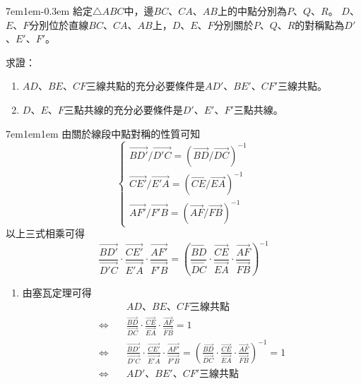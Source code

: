\documentclass[12pt]{article}
\begin{document}
\begin{mybox}[Problem 8]{7em}{1em}{-0.3em}
   給定$\triangle{ABC}$中，邊$BC$、$CA$、$AB$上的中點分別為$P$、$Q$、$R$。
   $D$、$E$、$F$分別位於直線$BC$、$CA$、$AB$上，$D$、$E$、$F$分別關於$P$、$Q$、$R$的對稱點為$D'$、$E'$、$F'$。

   求證：
   \begin{enumerate}[label=(\roman*)]
       \item $AD$、$BE$、$CF$三線共點的充分必要條件是$AD'$、$BE'$、$CF'$三線共點。
       \item $D$、$E$、$F$三點共線的充分必要條件是$D'$、$E'$、$F'$三點共線。
   \end{enumerate}
\end{mybox}
\begin{mybox}[Answer 8]{7em}{1em}{1em}
    由關於線段中點對稱的性質可知
    $$
        \begin{cases}
            \overrightarrow{BD'}/\overrightarrow{D'C}=\left(\overrightarrow{BD}/\overrightarrow{DC}\right)^{-1}\\
            \overrightarrow{CE'}/\overrightarrow{E'A}=\left(\overrightarrow{CE}/\overrightarrow{EA}\right)^{-1}\\
            \overrightarrow{AF'}/\overrightarrow{F'B}=\left(\overrightarrow{AF}/\overrightarrow{FB}\right)^{-1}
        \end{cases}
    $$
    以上三式相乘可得
    $$
        \frac{\overrightarrow{BD'}}{\overrightarrow{D'C}}
        \cdot\frac{\overrightarrow{CE'}}{\overrightarrow{E'A}}
        \cdot\frac{\overrightarrow{AF'}}{\overrightarrow{F'B}} 
        =\left(\frac{\overrightarrow{BD}}{\overrightarrow{DC}}
        \cdot\frac{\overrightarrow{CE}}{\overrightarrow{EA}}
        \cdot\frac{\overrightarrow{AF}}{\overrightarrow{FB}} \right)^{-1}
    $$
    \begin{enumerate}[label=(\roman*)]
        \item 由塞瓦定理可得    
        \begin{align*}
           &\text{$AD$、$BE$、$CF$三線共點}\\
           \Leftrightarrow\quad&\frac{\overrightarrow{BD}}{\overrightarrow{DC}}
           \cdot\frac{\overrightarrow{CE}}{\overrightarrow{EA}}
           \cdot\frac{\overrightarrow{AF}}{\overrightarrow{FB}}=1\\
           \Leftrightarrow\quad&\frac{\overrightarrow{BD'}}{\overrightarrow{D'C}}
           \cdot\frac{\overrightarrow{CE'}}{\overrightarrow{E'A}}
           \cdot\frac{\overrightarrow{AF'}}{\overrightarrow{F'B}}
           =\left(\frac{\overrightarrow{BD}}{\overrightarrow{DC}}
           \cdot\frac{\overrightarrow{CE}}{\overrightarrow{EA}}
           \cdot\frac{\overrightarrow{AF}}{\overrightarrow{FB}}\right)^{-1}=1\\
           \Leftrightarrow\quad&\text{$AD'$、$BE'$、$CF'$三線共點}
        \end{align*}


\end{enumerate}
\end{mybox}
\end{document}

